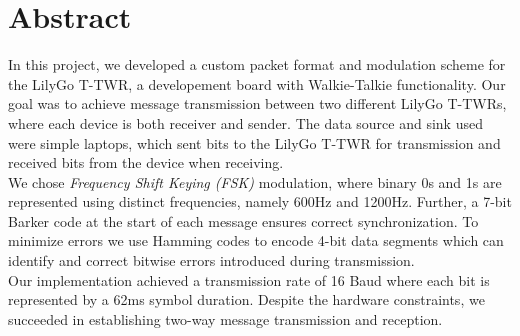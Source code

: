 \chapter{Abstract}
In this project, we developed a custom packet format and modulation scheme for the LilyGo T-TWR, a developement board with Walkie-Talkie functionality. Our goal was to achieve message transmission between two different LilyGo T-TWRs, where each device is both receiver and sender. The data source and sink used were simple laptops, which sent bits to the LilyGo T-TWR for transmission and received bits from the device when receiving. %
\\
We chose \textit{Frequency Shift Keying (FSK)} modulation, where binary 0s and 1s are represented using distinct frequencies, namely 600Hz and 1200Hz. Further, a 7-bit Barker code at the start of each message ensures correct synchronization. To minimize errors we use Hamming codes to encode 4-bit data segments which can identify and correct bitwise errors introduced during transmission. 
\\
Our implementation achieved a transmission rate of 16 Baud where each bit is represented by a 62ms symbol duration. Despite the hardware constraints, we succeeded in establishing two-way message transmission and reception.